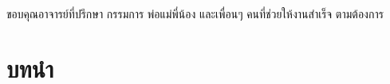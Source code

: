 \documentclass[12pt,oneside,openright,a4paper]{cpe-thai-project}
\begin{document}
\preface
ขอบคุณอาจารย์ที่ปรึกษา กรรมการ พ่อแม่พี่น้อง และเพื่อนๆ คนที่ช่วยให้งานสำเร็จ ตามต้องการ

\tableofcontents                    
\listoftables
\listoffigures                      





\chapter{บทนำ}
\end{document}
